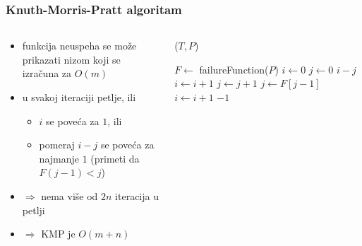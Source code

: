 \documentclass[compress]{beamer}
\begin{document}
\begin{frame}[fragile,shrink=12]
  \frametitle{Knuth-Morris-Pratt algoritam}
  \begin{columns}
    \begin{column}[t]{6cm}
      \begin{itemize}
        \item funkcija neuspeha se može prikazati nizom koji se izračuna za $O(m)$
        \item u svakoj iteraciji petlje, ili
        \begin{itemize}
          \item $i$ se poveća za $1$, ili
          \item pomeraj $i-j$ se poveća za najmanje $1$ (primeti da $F(j-1)<j$)
        \end{itemize}
        \item $\Rightarrow$ nema više od $2n$ iteracija u petlji
        \item $\Rightarrow$ KMP je $O(m+n)$
      \end{itemize}
    \end{column}
    \begin{column}[t]{6cm}
      ($T, P$)
      \begin{algorithmic}
        \STATE $F \leftarrow$ failureFunction($P$)
        \STATE $i \leftarrow 0$
        \STATE $j \leftarrow 0$
              \RETURN $i-j$ 
            \ELSE
              \STATE $i \leftarrow i+1$
              \STATE $j \leftarrow j+1$
            \ENDIF
          \ELSE
              \STATE $j \leftarrow F[j-1]$
            \ELSE
              \STATE $i \leftarrow i + 1$
            \ENDIF
          \ENDIF
        \ENDWHILE
        \RETURN $-1$ 
      \end{algorithmic}    
    \end{column}
  \end{columns}
\end{frame}
\end{document}
